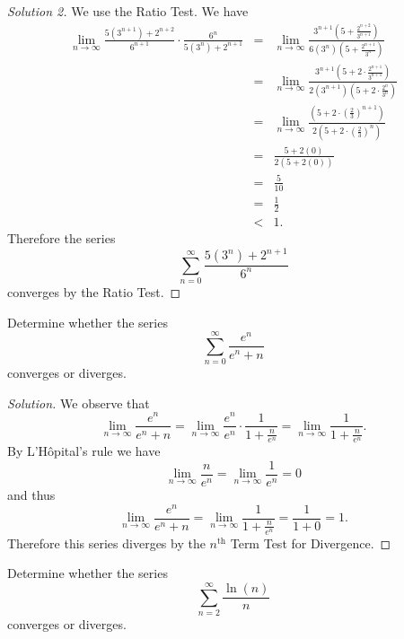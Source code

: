 \documentclass[12pt]{amsart}
\begin{document}
\begin{proof}[Solution 2]

  We use the Ratio Test.
  We have
  \begin{eqnarray*}
  \lim_{n \to \infty} \frac{5(3^{n+1}) + 2^{n+2}}{6^{n+1}} \cdot \frac{6^n}{5(3^{n}) + 2^{n+1}}
  &=& \lim_{n \to \infty} \frac{3^{n + 1}(5 + \frac{2^{n + 2}}{3^{n+1}})}{6(3^n)(5 + \frac{2^{n+1}}{3^n})}\\
  &=& \lim_{n \to \infty} \frac{3^{n + 1}(5 + 2 \cdot \frac{2^{n + 1}}{3^{n+1}})}{2(3^{n+1})(5 + 2 \cdot \frac{2^{n}}{3^n})}\\
  &=& \lim_{n \to \infty} \frac{(5 + 2 \cdot \left(\frac{2}{3}\right)^{n+1})}{2(5 + 2 \cdot \left(\frac{2}{3}\right)^n)}\\
  &=& \frac{5 + 2(0)}{2(5 + 2(0))}\\
  &=& \frac{5}{10}\\
  &=& \frac{1}{2}\\
  &<& 1.
  \end{eqnarray*}
  Therefore the series
  \[\sum_{n = 0}^\infty \frac{5(3^n) + 2^{n+1}}{6^n}\]
  converges by the Ratio Test.
\end{proof}
\begin{thm}[5 Points]
  Determine whether the series
  \[\sum_{n=0}^\infty \frac{e^n}{e^n + n}\]
  converges or diverges.
\end{thm}

\begin{proof}[Solution]
  We observe that
  \[\lim_{n \to \infty} \frac{e^n}{e^n + n} = \lim_{n \to \infty} \frac{e^n}{e^n} \cdot \frac{1}{1 + \frac{n}{e^n}} = \lim_{n \to \infty} \frac{1}{1 + \frac{n}{e^n}}.\]
  By L'H\^opital's rule we have
  \[\lim_{n \to \infty} \frac{n}{e^n} = \lim_{n \to \infty} \frac{1}{e^n} = 0\]
  and thus
  \[\lim_{n \to \infty} \frac{e^n}{e^n + n} = \lim_{n \to \infty} \frac{1}{1 + \frac{n}{e^n}} = \frac{1}{1 + 0} = 1.\]
  Therefore this series diverges by the \(n^\text{th}\) Term Test for Divergence.
\end{proof}

\begin{thm}[5 Points]
  Determine whether the series
  \[\sum_{n=2}^\infty \frac{\ln(n)}{n}\]
  converges or diverges.
\end{thm}
\end{document}
